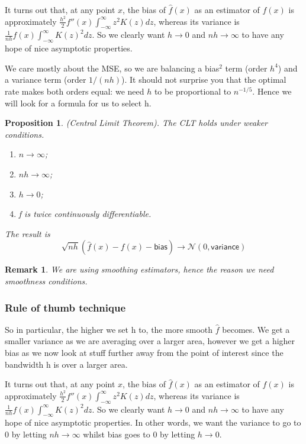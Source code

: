 \documentclass[twoside]{article}
\newtheorem{proposition}[theorem]{Proposition}
\newtheorem{remark}[theorem]{Remark}
\begin{document}
It turns out that, at any point $x$, the bias of $\hat{f}\left(x\right)$ as an estimator of $f\left(x\right)$ is approximately $\frac{h^2}{2}f''\left(x\right)\int_{-\infty}^\infty z^2K\left(z\right)dz$, whereas its variance is $\frac{1}{nh}f\left(x\right)\int_{-\infty}^\infty K\left(z\right)^2dz$. So we clearly want $h\rightarrow0$ and $nh\rightarrow\infty$ to have any hope of nice asymptotic properties.


We care mostly about the MSE, so we are balancing a bias$^2$ term (order $h^4$) and a variance term (order $1/\left(nh\right)$). It should not surprise you that the optimal rate makes both orders equal: we need $h$ to be proportional to $n^{-1/5}$. Hence we will look for a formula for us to select h.

\begin{proposition}(Central Limit Theorem). The CLT holds under weaker conditions.

\begin{enumerate}
    \item $n \rightarrow \infty$;
    \item $nh \rightarrow \infty$;
    \item $h \rightarrow 0$;
    \item f is twice continuously differentiable.
\end{enumerate} 

The result is \[\sqrt{nh}\left(\hat{f}\left(x\right)-f\left(x\right)-\textsf{bias}\right)\rightarrow\mathcal{N}\left(0,\textsf{variance}\right)\]
\end{proposition}

\begin{remark} We are using smoothing estimators, hence the reason we need smoothness conditions. 
\end{remark}

\subsubsection{Rule of thumb technique}
So in particular, the higher we set h to, the more smooth $\hat{f}$ becomes. We get a smaller variance as we are averaging over a larger area, however we get a higher bias as we now look at stuff further away from the point of interest since the bandwidth h is over a larger area.

It turns out that, at any point $x$, the bias of $\hat{f}\left(x\right)$ as an estimator of $f\left(x\right)$ is approximately $\frac{h^2}{2}f''\left(x\right)\int_{-\infty}^\infty z^2K\left(z\right)dz$, whereas its variance is $\frac{1}{nh}f\left(x\right)\int_{-\infty}^\infty K\left(z\right)^2dz$. So we clearly want $h\rightarrow0$ and $nh\rightarrow\infty$ to have any hope of nice asymptotic properties. In other words, we want the variance to go to 0 by letting $nh \rightarrow \infty$ whilst bias goes to 0 by letting $h \rightarrow 0$.
\end{document}
